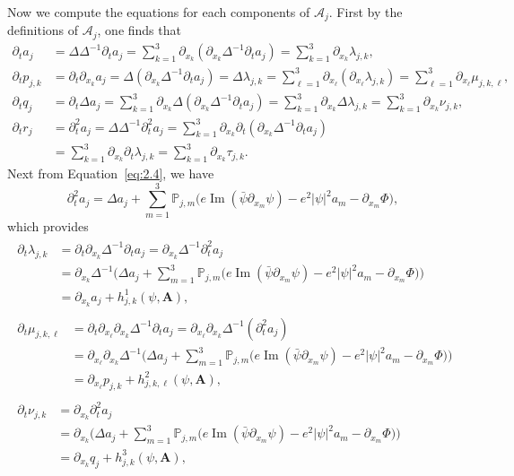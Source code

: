 \documentclass[AHL,Unicode,longabstracts]{cedram}
\newcommand{\BA}{\mathbf{A}}
\DeclareMathOperator{\IM}{Im}
\begin{document}
Now we compute the equations for each components of $\mathcal{A}_j$. First by the definitions of $\mathcal{A}_j$, one finds that
\begin{align*}
\partial_t a_j &= \Delta \Delta^{-1} \partial_t a_j = \sum_{k=1}^3 \partial_{x_k} (\partial_{x_k} \Delta^{-1} \partial_t a_j) = \sum_{k=1}^3 \partial_{x_k} \lambda_{j,k}, \\
\partial_t p_{j,k} &= \partial_t \partial_{x_k} a_j = \Delta (\partial_{x_k} \Delta^{-1} \partial_t a_j) = \Delta \lambda_{j,k} = \sum_{\ell=1}^3 \partial_{x_\ell} (\partial_{x_\ell} \lambda_{j,k}) = \sum_{\ell=1}^3 \partial_{x_\ell} \mu_{j,k,\ell}, \\
\partial_t q_j &= \partial_t \Delta a_j = \sum_{k=1}^3 \partial_{x_k} \Delta (\partial_{x_k} \Delta^{-1} \partial_t a_j) =\sum_{k=1}^3 \partial_{x_k} \Delta \lambda_{j,k} =\sum_{k=1}^3 \partial_{x_k} \nu_{j,k}, \\
\partial_t r_j &= \partial_t^2 a_j = \Delta \Delta^{-1} \partial_t^2 a_j = \sum_{k=1}^3 \partial_{x_k} \partial_t (\partial_{x_k} \Delta^{-1} \partial_t a_j) \\
&= \sum_{k=1}^3 \partial_{x_k} \partial_t \lambda_{j,k} =\sum_{k=1}^3 \partial_{x_k} \tau_{j,k}.
\end{align*}
Next from Equation~\eqref{eq:2.4}, we have
\[
\partial_t^2 a_j = \Delta a_j + \sum_{m=1}^3 {\mathbb P}_{j,m}
\Big(e \IM (\bar{\psi} \partial_{x_m} \psi)-e^2|\psi|^2 a_m
-\partial_{x_m} \Phi \Big),
\]
which provides
\begin{gather*}
\begin{aligned}
\partial_t \lambda_{j,k} &= \partial_t \partial_{x_k} \Delta^{-1} \partial_t a_j = \partial_{x_k} \Delta^{-1} \partial_t^2 a_j \\
&= \partial_{x_k} \Delta^{-1} \Big(\Delta a_j + \sum_{m=1}^3 {\mathbb P}_{j,m}
\Big(e \IM (\bar{\psi} \partial_{x_m} \psi)-e^2|\psi|^2 a_m -\partial_{x_m} \Phi \Big) \Big) \\
&= \partial_{x_k} a_j + h_{j,k}^1 (\psi, \BA),
\end{aligned}\\[1.25em]
\begin{aligned}
\partial_t \mu_{j,k,\ell} &= \partial_t \partial_{x_\ell} \partial_{x_k} \Delta^{-1} \partial_t a_j = \partial_{x_\ell} \partial_{x_k} \Delta^{-1} (\partial_t^2 a_j) \\
&= \partial_{x_\ell} \partial_{x_k} \Delta^{-1}
\Big(\Delta a_j + \sum_{m=1}^3 {\mathbb P}_{j,m}
\Big(e \IM (\bar{\psi} \partial_{x_m} \psi)-e^2|\psi|^2 a_m -\partial_{x_m} \Phi \Big) \Big) \\
&= \partial_{x_\ell} p_{j,k} +h_{j,k,\ell}^2 (\psi,\BA),
\end{aligned}\\[1.25em]
\begin{aligned}
\partial_t \nu_{j,k} &= \partial_{x_k} \partial_t^2 a_j \\
&= \partial_{x_k}
\Big(\Delta a_j + \sum_{m=1}^3 {\mathbb P}_{j,m}
\Big(e \IM (\bar{\psi} \partial_{x_m} \psi)-e^2|\psi|^2 a_m -\partial_{x_m} \Phi \Big) \Big) \\
&= \partial_{x_k} q_j +h_{j,k}^3(\psi,\BA),
\end{aligned}
\end{gather*}
\end{document}
